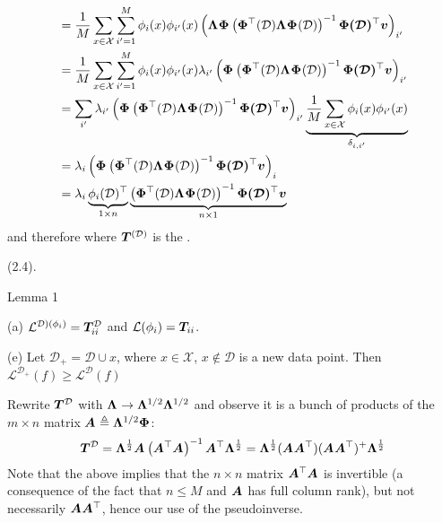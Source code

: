\documentclass{article}
\renewcommand\vec[2][]{\bm{#2}_{#1}}
\newcommand\mc{\mathcal}
\begin{document}
\begin{appendices}
\begin{align}
	&= \inv{M} \sum_{x \in \mc X} \sum_{i' = 1}^{M}  \phi_i(x) \phi_{i'}(x) 
	\lr{ \matr \Lambda \matr\Phi 
		\lr{\matr{\Phi}^\top(\mc D) \matr\Lambda \matr{\Phi}(\mc D)}^{-1} \matr{\Phi(\mc D)}^\top \vec v }_{i'} \\
	&= \inv{M} \sum_{x \in \mc X} \sum_{i' = 1}^{M}  \phi_i(x) \phi_{i'}(x)  \lambda_{i'}
	\lr{ \matr\Phi 
		\lr{\matr{\Phi}^\top(\mc D) \matr \Lambda \matr{\Phi}(\mc D)}^{-1} \matr{\Phi(\mc D)}^\top \vec v }_{i'} \\
	&= \sum_{i'}  \lambda_{i'}
	\lr{ \matr\Phi 
		\lr{\matr{\Phi}^\top(\mc D) \matr \Lambda \matr{\Phi}(\mc D)}^{-1} \matr{\Phi(\mc D)}^\top \vec v }_{i'} \underbrace{  \inv{M}\sum_{x \in \mc X} \phi_i(x) \phi_{i'}(x)   }_{\delta_{i,i'}} \\
	&=  \lambda_{i}
	\lr{ \matr\Phi 
		\lr{\matr{\Phi}^\top(\mc D) \matr \Lambda  \matr{\Phi}(\mc D)}^{-1} \matr{\Phi(\mc D)}^\top \vec v }_{i} \\
	&= \lambda_i \underbrace{ \phi_i(\mc D)^\top }_{1 \times n} \underbrace{	\lr{\matr{\Phi}^\top(\mc D) \matr \Lambda  \matr{\Phi}(\mc D)}^{-1} \matr{\Phi(\mc D)}^\top \vec v }_{n \times 1}
\end{align}
and therefore
\graybox{
	\vec{\hat v}
	&=  \underbrace{ \matr \Lambda \matr\Phi(\mc D)   \lr{ \matr{\Phi}^\top(\mc D) \matr \Lambda \matr\Phi(\mc D) }^{-1} \matr{\Phi}^\top (\mc D) }_{\triangleq \matr{T}^{(\mc D)}} \vec v 
}
where $\matr{T}^{(\mc D)}$ is the . 


 (2.4). 

\begin{itemdefinition}{Lemma 1}{}
	\item[(a)] $\mc L^{\mc D)(\phi_i)} = \matr[ii]{T}^{\mc D}$ and $\mc L(\phi_i) = \matr[ii]{T}$. 
	\item[(e)] Let $\mc D_{+} = \mc D \cup x$, where $x \in \mc X$, $x \notin \mc D$ is a new data point. Then $\mc{L}^{\mc D_+} (f) \geq \mc L^{\mc D}(f)$
\end{itemdefinition}

\begin{example}
	\begin{compactenum}
		\item Rewrite $\matr{T}^{\mc D}$ with $\bm{\Lambda}_{} \rightarrow \bm{\Lambda}_{}^{1/2} \bm{\Lambda}_{}^{1/2}$ and observe it is a bunch of products of the $m \times n$ matrix $\bm{A}_{} \triangleq \bm{\Lambda}_{}^{1/2} \bm{\Phi}_{}$:
		$$
		\matr{T}^{\mc D} 
		= \matr{\Lambda}^{\onehalf} \matr A \lr{\matr A^\top \matr A}^{-1} \matr A^\top \matr{\Lambda}^{\onehalf}
		= \matr{\Lambda}^{\onehalf} (\matr A \matr A^\top) (\matr A \matr A^\top)^{+}  \matr{\Lambda}^{\onehalf}
		$$
		Note that the above implies that the $n \times n$ matrix $\bm{A}_{}^\top \bm{A}_{}$ is invertible (a consequence of the fact that $n \leq M$ and $\bm{A}_{}$ has full column rank), but not necessarily $\bm{A}_{} \bm{A}_{}^\top$, hence our use of the pseudoinverse. 
		

\end{compactenum}
\end{example}
\end{appendices}
\end{document}
